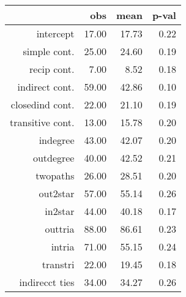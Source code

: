 \begin{table}[ht]
\centering
\begin{tabular}{rrrr}
  \hline
 & obs & mean & p-val \\ 
  \hline
intercept & 17.00 & 17.73 & 0.22 \\ 
  simple cont. & 25.00 & 24.60 & 0.19 \\ 
  recip cont. & 7.00 & 8.52 & 0.18 \\ 
  indirect cont. & 59.00 & 42.86 & 0.10 \\ 
  closedind cont. & 22.00 & 21.10 & 0.19 \\ 
  transitive cont. & 13.00 & 15.78 & 0.20 \\ 
  indegree & 43.00 & 42.07 & 0.20 \\ 
  outdegree & 40.00 & 42.52 & 0.21 \\ 
  twopaths & 26.00 & 28.51 & 0.20 \\ 
  out2star & 57.00 & 55.14 & 0.26 \\ 
  in2star & 44.00 & 40.18 & 0.17 \\ 
  outtria & 88.00 & 86.61 & 0.23 \\ 
  intria & 71.00 & 55.15 & 0.24 \\ 
  transtri & 22.00 & 19.45 & 0.18 \\ 
  indirecct ties & 34.00 & 34.27 & 0.26 \\ 
   \hline
\end{tabular}
\end{table}
